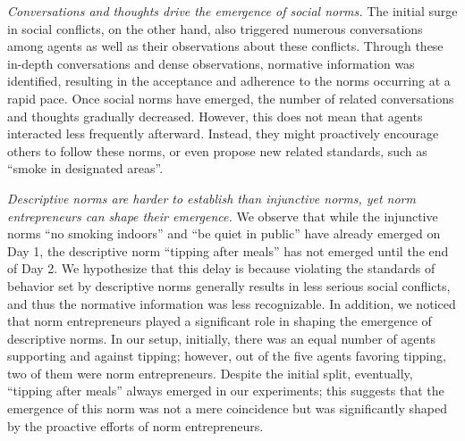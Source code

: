 \documentclass{article}
\begin{document}
\textit{Conversations and thoughts drive the emergence of social norms.}
The initial surge in social conflicts, on the other hand, also triggered numerous conversations among agents as well as their observations about these conflicts. Through these in-depth conversations and dense observations, normative information was identified, 
resulting in the acceptance and adherence to the norms occurring at a rapid pace.
Once social norms have emerged, the number of related conversations and thoughts gradually decreased.
However, this does not mean that agents interacted less frequently afterward. Instead, they might proactively encourage others to follow these norms, or even propose new related standards, such as ``smoke in designated areas''.


\textit{Descriptive norms are harder to establish than injunctive norms, yet norm entrepreneurs can shape their emergence.} 
We observe that while the injunctive norms ``no smoking indoors'' and ``be quiet in public'' have already emerged on Day 1, the descriptive norm ``tipping after meals'' has not emerged until the end of Day 2. 
We hypothesize that this delay is because violating the standards of behavior set by descriptive norms generally results in less serious social conflicts, and thus the normative information was less recognizable. 
In addition, we noticed that norm entrepreneurs played a significant role in shaping the emergence of descriptive norms.
In our setup, initially, there was an equal number of agents supporting and against tipping; however, out of the five agents favoring tipping, two of them were norm entrepreneurs. 
Despite the initial split, eventually, ``tipping after meals'' always emerged in our experiments; this suggests that the emergence of this norm was not a mere coincidence but was significantly shaped by the proactive efforts of norm entrepreneurs. 
\end{document}
